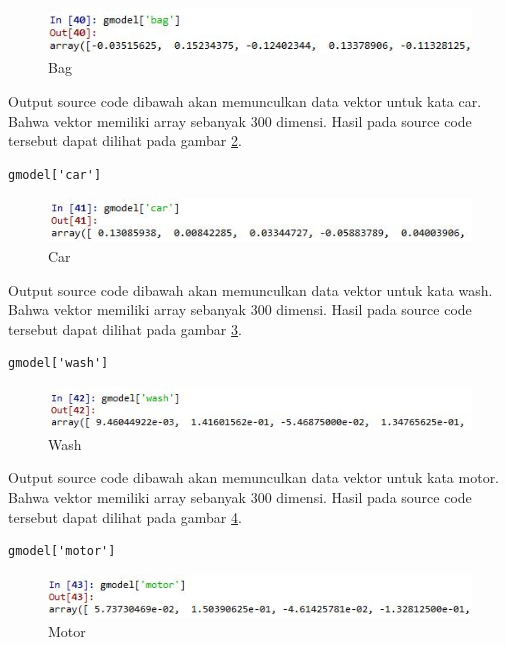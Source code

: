 \begin{enumerate}
\begin{figure}[!htbp]
\centerline{\includegraphics[width=1\textwidth]{figures/c5p/13.JPG}}
\caption{Bag}
\label{c5_13}
\end{figure}
\subitem Output source code dibawah akan memunculkan data vektor untuk kata car. Bahwa vektor memiliki array sebanyak 300 dimensi. Hasil pada source code tersebut dapat dilihat pada gambar \ref{c5_14}.
\begin{verbatim}
gmodel['car']
\end{verbatim}
\begin{figure}[!htbp]
\centerline{\includegraphics[width=1\textwidth]{figures/c5p/14.JPG}}
\caption{Car}
\label{c5_14}
\end{figure}
\subitem Output source code dibawah akan memunculkan data vektor untuk kata wash. Bahwa vektor memiliki array sebanyak 300 dimensi. Hasil pada source code tersebut dapat dilihat pada gambar \ref{c5_15}.
\begin{verbatim}
gmodel['wash']
\end{verbatim}
\begin{figure}[!htbp]
\centerline{\includegraphics[width=1\textwidth]{figures/c5p/15.JPG}}
\caption{Wash}
\label{c5_15}
\end{figure}
\subitem Output source code dibawah akan memunculkan data vektor untuk kata motor. Bahwa vektor memiliki array sebanyak 300 dimensi. Hasil pada source code tersebut dapat dilihat pada gambar \ref{c5_16}.
\begin{verbatim}
gmodel['motor']
\end{verbatim}
\begin{figure}[!htbp]
\centerline{\includegraphics[width=1\textwidth]{figures/c5p/16.JPG}}
\caption{Motor}
\label{c5_16}
\end{figure}

\end{enumerate}
